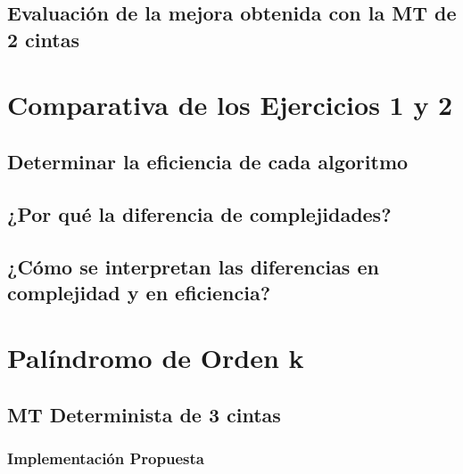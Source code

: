 \documentclass{uc3mpracticas}
\begin{document}
  \subsection{Evaluación de la mejora obtenida con la MT de 2 cintas}







  \newpage

  \section{Comparativa de los Ejercicios 1 y 2}

  \subsection{Determinar la eficiencia de cada algoritmo}

  \subsection{¿Por qué la diferencia de complejidades?}

  \subsection{¿Cómo se interpretan las diferencias en complejidad y en eficiencia?}





  \newpage


  \section{Palíndromo de Orden k}

  \subsection{MT Determinista de 3 cintas}


  \subsubsection{Implementación Propuesta}
\end{document}
